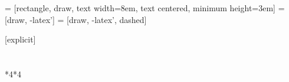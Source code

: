 \usepackage{cmap} %
\usepackage[T2A]{fontenc} %
\usepackage[utf8]{inputenc} %
\usepackage[english,russian]{babel} %

\usepackage[14pt]{extsizes}

\usepackage[table]{xcolor}

\usepackage{graphicx}
\usepackage{multirow}

\usepackage{tikz}
\usetikzlibrary{shapes, arrows, positioning}


 = [rectangle, draw, text width=8em, text centered, minimum height=3em]
 = [draw, -latex']
 = [draw, -latex', dashed]
\usepackage{pgfplots}



\usepackage{caption}
\captionsetup{labelsep=endash}

\usepackage{booktabs}

\usepackage{amsmath}
\usepackage{amsfonts}

\usepackage{geometry}
\geometry{left=35mm}
\geometry{right=10mm}
\geometry{top=20mm}
\geometry{bottom=20mm}

\usepackage{enumitem}

\usepackage{tabularx}


\usepackage{titlesec}[explicit]
\titleformat{\section}[block]{\normalfont\large\bfseries}{\thesection}{1em}{}
\titlespacing\section{\parindent}{*4}{*4}

